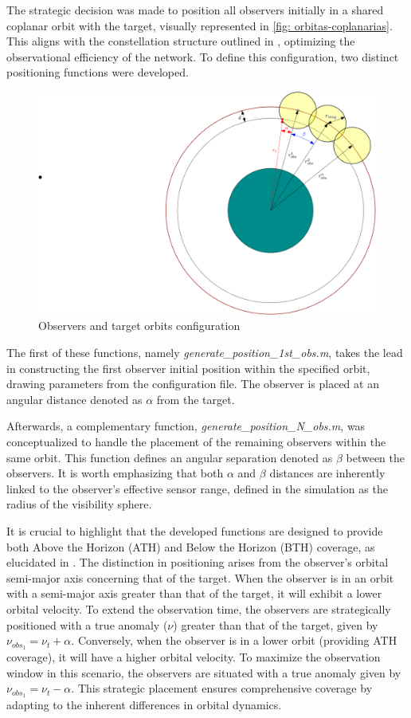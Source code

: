 The strategic decision was made to position all observers initially in a shared coplanar orbit with the target, visually represented in  \autoref{fig: orbitas-coplanarias}. This aligns with the constellation structure outlined in \cite{constellations}, optimizing the observational efficiency of the network. To define this configuration, two distinct positioning functions were developed.
\begin{figure}[H]
\centering
\includegraphics[width=0.6\columnwidth]{Figures/orbitas.png}
\caption{Observers and target orbits configuration}
\label{fig: orbitas-coplanarias}
\end{figure}
The first of these functions, namely \textit{generate\_position\_1st\_obs.m}, takes the lead in constructing the first observer initial position within the specified orbit, drawing parameters from the configuration file. The observer is placed at an angular distance denoted as $\alpha$ from the target.

Afterwards, a complementary function, \textit{generate\_position\_N\_obs.m}, was conceptualized to handle the placement of the remaining observers within the same orbit. This function defines an angular separation denoted as $\beta$ between the observers. It is worth emphasizing that both $\alpha$ and $\beta$ distances are inherently linked to the observer's effective sensor range, defined in the simulation as the radius of the visibility sphere.

It is crucial to highlight that the developed functions are designed to provide both Above the Horizon (ATH) and Below the Horizon (BTH) coverage, as elucidated in \cite{ATH-BTH}. The distinction in positioning arises from the observer's orbital semi-major axis concerning that of the target. When the observer is in an orbit with a semi-major axis greater than that of the target, it will exhibit a lower orbital velocity. To extend the observation time, the observers are strategically positioned with a true anomaly ($\nu$) greater than that of the target, given by $\nu_{obs_1} = \nu_t + \alpha$. Conversely, when the observer is in a lower orbit (providing ATH coverage), it will have a higher orbital velocity. To maximize the observation window in this scenario, the observers are situated with a true anomaly given by $\nu_{obs_1} = \nu_t - \alpha$. This strategic placement ensures comprehensive coverage by adapting to the inherent differences in orbital dynamics.

